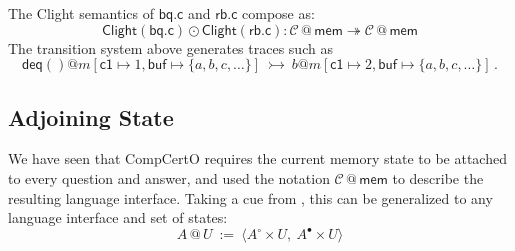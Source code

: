 \documentclass[acmsmall,screen,review,anonymous]{acmart}
\newcommand{\kw}[1]{\ensuremath{ \mathsf{#1} }}
\newcommand{\que}{\circ}
\newcommand{\ans}{\bullet}
\begin{document}
\begin{example} %
The Clight semantics of $\kw{bq.c}$ and $\kw{rb.c}$
compose as:
\[
  \kw{Clight}(\kw{bq.c}) \odot \kw{Clight}(\kw{rb.c})
  :
  \mathcal{C} \mathbin@ \kw{mem} \twoheadrightarrow
  \mathcal{C} \mathbin@ \kw{mem}
\]
The transition system above generates traces such as
\[
  \kw{deq}()@m[\kw{c1}\mapsto 1, \kw{buf}\mapsto\{a,b,c,\ldots\}]
  \:\rightarrowtail\:
  b@m[\kw{c1} \mapsto 2, \kw{buf} \mapsto \{a, b, c, \ldots\}]
  \,.
\]
\end{example}


\subsection{Adjoining State} \label{sec:overview:slift} %


We have seen that CompCertO
requires the current memory state to be attached
to every question and answer,
and used the notation $\mathcal{C} \mathbin@ \kw{mem}$
to describe the resulting language interface.
Taking a cue from \citet{rbgs-cal},
this can be generalized to any
language interface and set of states:
\[
  A \mathbin@ U \: := \:
    \langle A^\que \times U, \: A^\ans \times U \rangle
\]

\end{document}
